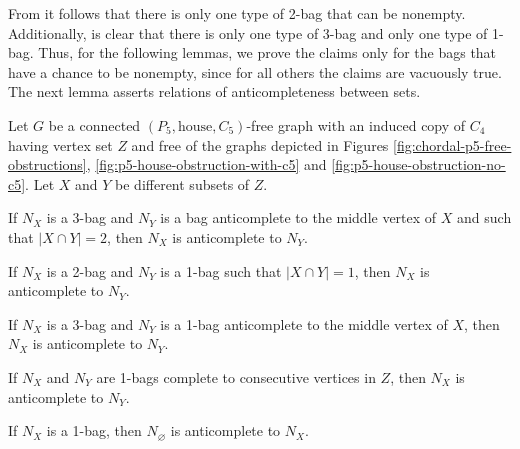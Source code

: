 From  it follows that there is only one type
of 2-bag that can be nonempty. Additionally, is clear that there is only one
type of 3-bag and only one type of 1-bag. Thus, for the following lemmas, we
prove the claims only for the bags that have a chance to be nonempty, since for
all others the claims are vacuously true. The next lemma asserts relations of
anticompleteness between sets.

\begin{lemma}
    Let $G$ be a connected $(P_5,\text{house},C_5)$-free graph with an induced
    copy of $C_4$ having vertex set $Z$ and free of the graphs depicted in
    Figures \ref{fig:chordal-p5-free-obstructions},
    \ref{fig:p5-house-obstruction-with-c5} and
    \ref{fig:p5-house-obstruction-no-c5}. Let $X$ and $Y$ be different subsets
    of $Z$.
    \begin{lemenum}
        \item If $N_X$ is a 3-bag and $N_Y$ is a bag anticomplete to the middle
        vertex of $X$ and such that $|X\cap Y|=2$, then $N_X$ is anticomplete to
        $N_Y$. \label{lem:anti_1}
        \item If $N_X$ is a 2-bag and $N_Y$ is a 1-bag such that $|X\cap Y|=1$,
            then $N_X$ is anticomplete to $N_Y$. \label{lem:anti_2}
        \item If $N_X$ is a 3-bag and $N_Y$ is a 1-bag anticomplete to the
            middle vertex of $X$, then $N_X$ is anticomplete to $N_Y$.
            \label{lem:anti_3}
        \item If $N_X$ and $N_Y$ are 1-bags complete to consecutive vertices in
            $Z$, then $N_X$ is anticomplete to $N_Y$. \label{lem:anti_4}
        \item If $N_X$ is a 1-bag, then $N_\varnothing$ is anticomplete to
            $N_X$. \label{lem:anti_5}
    \end{lemenum} 
\end{lemma}

